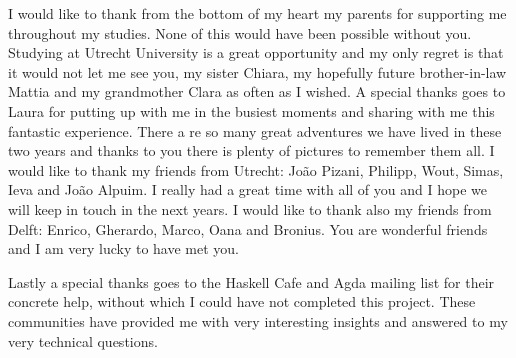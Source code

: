 \documentclass[12pt,a4paper]{report}
\begin{document}
I would like to thank from the bottom of my heart my parents for 
supporting me throughout my studies. None of this would have been possible
without you. Studying at Utrecht University is a great opportunity and
my only regret is that it would not let me see you, my sister Chiara, my hopefully future brother-in-law Mattia and my grandmother Clara as often as I wished.
A special thanks goes to Laura for putting up with me in the busiest moments
and sharing with me this fantastic experience.
There a	re so many great adventures we have lived in these two years and
thanks to you there is plenty of pictures to remember them all.
I would like to thank my friends from Utrecht: João Pizani, Philipp, Wout, Simas, Ieva and João Alpuim. I really had a great time with all of you and I hope we will
keep in touch in the next years.
I would like to thank also my friends from Delft: Enrico, Gherardo, Marco,
Oana and Bronius. You are wonderful friends and I am very lucky to
have met you.

Lastly a special thanks goes to the Haskell Cafe and Agda mailing list
for their concrete help, without which I could have not completed
this project.
These communities have provided me with very interesting insights and answered to my very technical questions.



\end{document}
